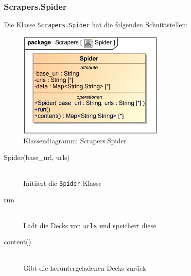 \subsubsection{Scrapers.Spider}
Die Klasse \verb|Scrapers.Spider| hat die folgenden Schnittstellen:
\begin{figure}[H]
    \myfloatalign
    \includegraphics[width=0.65\textwidth]{gfx/MtGDeepAnalysis/Spider.eps}
    \caption{Klassendiagramm: Scrapers.Spider}
    \label{fig:class:Scrapers.Spider}
\end{figure}
\begin{description}
    \item[Spider(base\_url, urls)] \hfill \\
    Initiiert die \verb|Spider| Klasse
    
    \item[run] \hfill \\
    Lädt die Decks von \verb|urls| und speichert diese
    
    \item[content()] \hfill \\
    Gibt die heruntergeladenen Decks zurück
\end{description}

